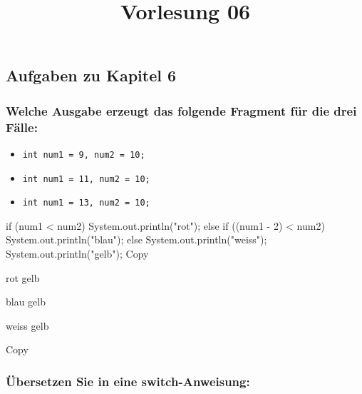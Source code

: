 \documentclass[
]{article}
\title{Vorlesung 06}
\author{}
\date{}
\newenvironment{Shaded}{}{}
\newcommand{\NormalTok}[1]{#1}
\providecommand{\tightlist}{%
  \setlength{\itemsep}{0pt}\setlength{\parskip}{0pt}}
\begin{document}
\maketitle

\subsection{Aufgaben zu Kapitel 6}\label{aufgaben-zu-kapitel-6}

\subsubsection{Welche Ausgabe erzeugt das folgende Fragment für die drei
Fälle:}\label{welche-ausgabe-erzeugt-das-folgende-fragment-fur-die-drei-fuxe4lle}

\begin{itemize}
\tightlist
\item
  \texttt{int\ num1\ =\ 9,\ num2\ =\ 10;}
\item
  \texttt{int\ num1\ =\ 11,\ num2\ =\ 10;}
\item
  \texttt{int\ num1\ =\ 13,\ num2\ =\ 10;}
\end{itemize}

\begin{Shaded}
\begin{Highlighting}[]
\NormalTok{if (num1 \textless{} num2)}
\NormalTok{    System.out.println("rot");}
\NormalTok{else}
\NormalTok{    if ((num1 {-} 2) \textless{} num2)}
\NormalTok{        System.out.println("blau");}
\NormalTok{    else}
\NormalTok{        System.out.println("weiss");}
\NormalTok{System.out.println("gelb");}
\NormalTok{Copy}
\end{Highlighting}
\end{Shaded}

\begin{Shaded}
\begin{Highlighting}[]
\NormalTok{rot}
\NormalTok{gelb}

\NormalTok{blau}
\NormalTok{gelb}

\NormalTok{weiss}
\NormalTok{gelb}

\NormalTok{Copy}
\end{Highlighting}
\end{Shaded}

\subsubsection{Übersetzen Sie in eine
switch-Anweisung:}\label{uxfcbersetzen-sie-in-eine-switch-anweisung}
\end{document}
